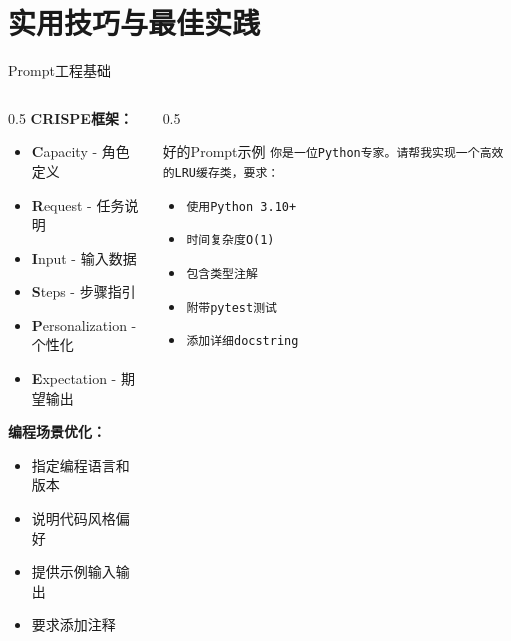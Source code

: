 \documentclass[aspectratio=169,11pt]{beamer}
\begin{document}
\section{实用技巧与最佳实践}

\begin{frame}{Prompt工程基础}
    \begin{columns}
        \begin{column}{0.5\textwidth}
            \textbf{CRISPE框架：}
            \begin{itemize}
                \item \textbf{C}apacity - 角色定义
                \item \textbf{R}equest - 任务说明
                \item \textbf{I}nput - 输入数据
                \item \textbf{S}teps - 步骤指引
                \item \textbf{P}ersonalization - 个性化
                \item \textbf{E}xpectation - 期望输出
            \end{itemize}
            
            \vspace{0.3cm}
            \textbf{编程场景优化：}
            \begin{itemize}
                \item 指定编程语言和版本
                \item 说明代码风格偏好
                \item 提供示例输入输出
                \item 要求添加注释
            \end{itemize}
        \end{column}
        \begin{column}{0.5\textwidth}
            \begin{exampleblock}{好的Prompt示例}
                \small
                \texttt{你是一位Python专家。请帮我实现一个高效的LRU缓存类，要求：}
                \begin{itemize}
                    \item \texttt{使用Python 3.10+}
                    \item \texttt{时间复杂度O(1)}
                    \item \texttt{包含类型注解}
                    \item \texttt{附带pytest测试}
                    \item \texttt{添加详细docstring}
                \end{itemize}
            \end{exampleblock}
            

\end{column}
\end{columns}
\end{frame}
\end{document}
